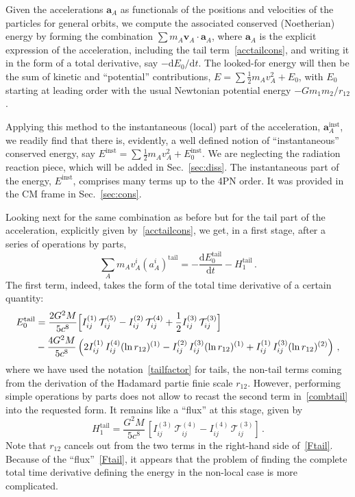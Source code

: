 \documentclass[prd,preprint,superscriptaddress,tightenlines,nofootinbib,
  eqsecnum,showpacs]{revtex4}
\newcommand{\ud}{\mathrm{d}}
\begin{document}
Given the accelerations $\bm{a}_A$ as functionals of the positions and
velocities of the particles for general orbits, we compute the associated
conserved (Noetherian) energy by forming the combination
$\sum m_A \bm{v}_A\cdot\bm{a}_A$, where $\bm{a}_A$ is the explicit expression
of the acceleration, including the tail
term~\eqref{acctailcons}, and writing it in the form of a total derivative,
say $-\ud E_0/\ud t$. The looked-for energy will then be the sum of kinetic
and ``potential'' contributions, $E = \sum \frac{1}{2} m_A v_A^2 + E_0$,
with $E_0$ starting  at leading order with the usual Newtonian potential energy
$-G m_1 m_2/r_{12}$.

Applying this method to the instantaneous (local) part of the acceleration,
$\bm{a}_A^\text{inst}$, we readily find that there is, evidently, a
well defined notion of ``instantaneous'' conserved energy, say
$E^\text{inst}=\sum \frac{1}{2} m_A v_A^2 + E_0^\text{inst}$. We are
neglecting the radiation reaction piece, which will be added in
Sec.~\ref{sec:diss}. The instantaneous part of the energy, $E^\text{inst}$,
comprises many terms up to the 4PN order. It was provided in the CM frame in
Sec.~\ref{sec:cons}.

Looking next for the same combination as before but for the tail part of the
acceleration, explicitly given by~\eqref{acctailcons}, we get, in a first
stage, after a series of operations by parts,
%
\begin{equation}\label{combtail}
\sum_A m_A v_A^i (a_A^i)^\text{tail} = - \frac{\ud E_0^\text{tail}}{\ud t} -
H_1^\text{tail} \,.
\end{equation}
%
The first term, indeed, takes the form of the total time derivative of a
certain quantity:
%
\begin{align}\label{E0tail}
E_0^\text{tail} &= \frac{2G^2M}{5c^8}\Bigl[
  I_{ij}^{(1)}\,\mathcal{T}_{ij}^{(5)} -
  I_{ij}^{(2)}\,\mathcal{T}_{ij}^{(4)} +
  \frac{1}{2}I_{ij}^{(3)}\,\mathcal{T}_{ij}^{(3)}\Bigr]\nonumber\\& -
\frac{4G^2M}{5c^8}\left( 2I_{ij}^{(1)}\,I_{ij}^{(4)} (\ln
r_{12})^{(1)} - I_{ij}^{(2)}\,I_{ij}^{(3)} (\ln r_{12})^{(1)} +
I_{ij}^{(1)}\,I_{ij}^{(3)} (\ln r_{12})^{(2)}
\right)\,,
\end{align}
%
where we have used the notation~\eqref{tailfactor} for tails, the
non-tail terms coming from the derivation of the Hadamard partie finie scale
$r_{12}$. However, performing simple operations by parts does not allow to
recast the second term in~\eqref{combtail} into the requested form. It
remains like a ``flux'' at this stage, given by
%
\begin{equation}\label{Ftail}
H_1^\text{tail} = \frac{G^2M}{5c^8}\,\left[
  I_{ij}^{(3)}\,\mathcal{T}_{ij}^{(4)} -
  I_{ij}^{(4)}\,\mathcal{T}_{ij}^{(3)}\right]\,.
\end{equation}
%
Note that $r_{12}$ cancels out from the two
terms in the right-hand side of~\eqref{Ftail}. Because of the
``flux''~\eqref{Ftail}, it appears that the problem of finding the complete total
time derivative defining the energy in the non-local case is more complicated.
\end{document}
